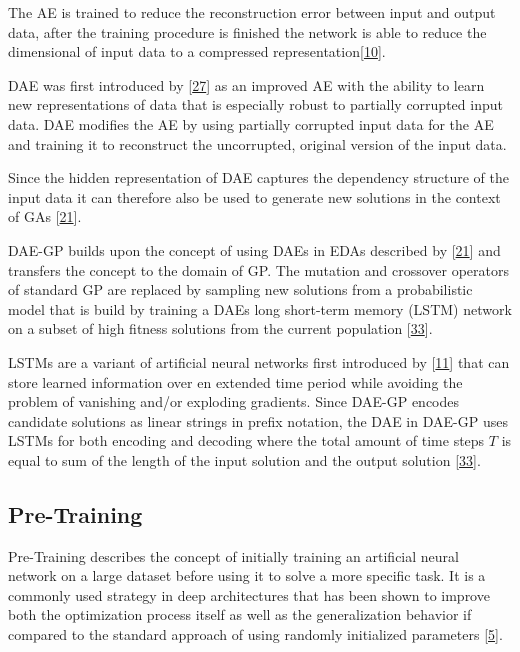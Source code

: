 \documentclass[
  11pt,
]{article}
\begin{document}
The AE is trained to reduce the reconstruction error between input and output data, after the training procedure is finished the network is able to reduce the dimensional of input data to a compressed representation{[}\protect\hyperlink{ref-ae_orig}{10}{]}.

DAE was first introduced by {[}\protect\hyperlink{ref-dae_orig2008}{27}{]} as an improved AE with the ability to learn new representations of data that is especially robust to partially corrupted input data. DAE modifies the AE by using partially corrupted input data for the AE and training it to reconstruct the uncorrupted, original version of the input data.

Since the hidden representation of DAE captures the dependency structure of the input data it can therefore also be used to generate new solutions in the context of GAs {[}\protect\hyperlink{ref-harmless_overfitting_eda}{21}{]}.

DAE-GP builds upon the concept of using DAEs in EDAs described by {[}\protect\hyperlink{ref-harmless_overfitting_eda}{21}{]} and transfers the concept to the domain of GP.
The mutation and crossover operators of standard GP are replaced by sampling new solutions from a probabilistic model that is build by training a DAEs long short-term memory (LSTM) network on a subset of high fitness solutions from the current population {[}\protect\hyperlink{ref-dae-gp_2020_rtree}{33}{]}.

LSTMs are a variant of artificial neural networks first introduced by {[}\protect\hyperlink{ref-lstm_orig}{11}{]} that can store learned information over en extended time period while avoiding the problem of vanishing and/or exploding gradients. Since DAE-GP encodes candidate solutions as linear strings in prefix notation, the DAE in DAE-GP uses LSTMs for both encoding and decoding where the total amount of time steps \(T\) is equal to sum of the length of the input solution and the output solution {[}\protect\hyperlink{ref-dae-gp_2020_rtree}{33}{]}.

\hypertarget{pre-training}{%
\subsection{Pre-Training}\label{pre-training}}

Pre-Training describes the concept of initially training an artificial neural network on a large dataset before using it to solve a more specific task.
It is a commonly used strategy in deep architectures that has been shown to improve both the optimization process itself as well as the generalization behavior if compared to the standard approach of using randomly initialized parameters {[}\protect\hyperlink{ref-pmlr-v5-erhan09a}{5}{]}.
\end{document}
